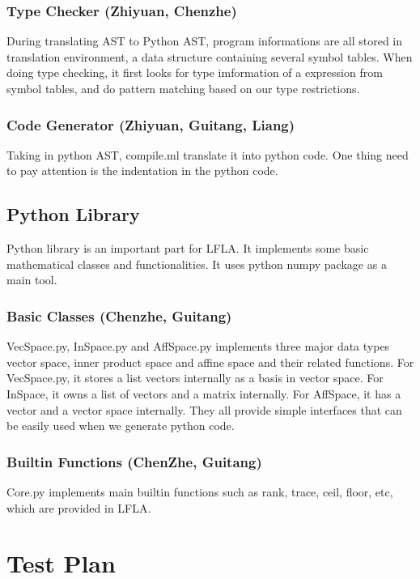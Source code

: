 \documentclass[12pt]{article} %
\begin{document}
\subsubsection{Type Checker (Zhiyuan, Chenzhe)}
\noindent During translating AST to Python AST, program informations are all stored in translation environment, a data structure containing several symbol tables. When doing type checking, it first looks for type imformation of a expression from symbol tables, and do pattern matching based on our type restrictions.

\subsubsection{Code Generator (Zhiyuan, Guitang, Liang)}
\noindent Taking in python AST, compile.ml translate it into python code. One thing need to pay attention is the indentation in the python code.

\subsection{Python Library}
\noindent Python library is an important part for LFLA. It implements some basic mathematical classes and functionalities. It uses python numpy package as a main tool.

\subsubsection{Basic Classes (Chenzhe, Guitang)}
\noindent VecSpace.py, InSpace.py and AffSpace.py implements three major data types vector space, inner product space and affine space and their related functions. For VecSpace.py, it stores a list vectors internally as a basis in vector space. For InSpace, it owns a list of vectors and a matrix internally. For AffSpace, it has a vector and a vector space internally. They all provide simple interfaces that can be easily used when we generate python code.

\subsubsection{Builtin Functions (ChenZhe, Guitang)}
\noindent Core.py implements main builtin functions such as rank, trace, ceil, floor, etc, which are provided in LFLA. 


\section{Test Plan}
\end{document}
